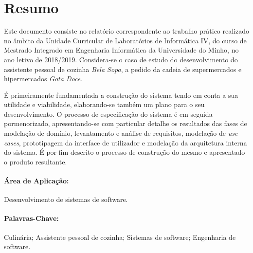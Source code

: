 
\section*{Resumo}

Este documento consiste no relatório correspondente ao trabalho prático realizado no âmbito da Unidade Curricular de Laboratórios de Informática IV, do curso de Mestrado Integrado em Engenharia Informática da Universidade do Minho, no ano letivo de 2018/2019. Considera-se o caso de estudo do desenvolvimento do assistente pessoal de cozinha \emph{Bela Sopa}, a pedido da cadeia de supermercados e hipermercados \emph{Gota Doce}.

É primeiramente fundamentada a construção do sistema tendo em conta a sua utilidade e viabilidade, elaborando-se também um plano para o seu desenvolvimento. O processo de especificação do sistema é em seguida pormenorizado, apresentando-se com particular detalhe os resultados das fases de modelação de domínio, levantamento e análise de requisitos, modelação de \emph{use cases}, prototipagem da interface de utilizador e modelação da arquitetura interna do sistema. É por fim descrito o processo de construção do mesmo e apresentado o produto resultante.


\paragraph{Área de Aplicação:}

Desenvolvimento de sistemas de software.


\vspace*{-\baselineskip}
\paragraph{Palavras-Chave:}

Culinária;
Assistente pessoal de cozinha;
Sistemas de software;
Engenharia de software.

